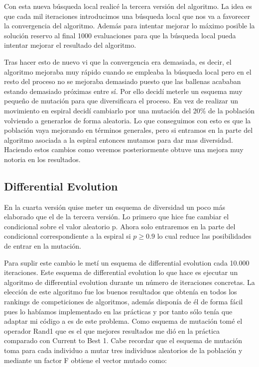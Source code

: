 \documentclass[12pt,a4paper]{article}
\begin{document}
	Con esta nueva búsqueda local realicé la tercera versión del algoritmo. La idea es que cada mil iteraciones introducimos una búsqueda local que nos va a favorecer la convergencia del algoritmo. Además para intentar mejorar lo máximo posible la solución reservo al final 1000 evaluaciones para que la búsqueda local pueda intentar mejorar el resultado del algoritmo. 
	
	Tras hacer esto de nuevo vi que la convergencia era demasiada, es decir, el algoritmo mejoraba muy rápido cuando se empleaba la búsqueda local pero en el resto del proceso no se mejoraba demasiado puesto que las ballenas acababan estando demasiado próximas entre sí. Por ello decidí meterle un esquema muy pequeño de mutación para que diversificara el proceso. En vez de realizar un movimiento en espiral decidí cambiarlo por una mutación del 20\% de la población volviendo a generarlos de forma aleatoria. Lo que conseguimos con esto es que la población vaya mejorando en términos generales, pero si entramos en la parte del algoritmo asociada a la espiral entonces mutamos para dar mas diversidad. Haciendo estos cambios como veremos posteriormente obtuve una mejora muy notoria en los resultados.
	
	\subsection{Differential Evolution}
	
    En la cuarta versión quise meter un esquema de diversidad un poco más elaborado que el de la tercera versión. Lo primero que hice fue cambiar el condicional sobre el valor aleatorio p. Ahora solo entraremos en la parte del condicional correspondiente a la espiral si $p\geq0.9$ lo cual reduce las posibilidades de entrar en la mutación.
    
    Para suplir este cambio le metí un esquema de differential evolution cada 10.000 iteraciones. Este esquema de differential evolution lo que hace es ejecutar un algoritmo de differential evolution durante un número de iteraciones concretas. La elección de este algoritmo fue los buenos resultados que obtenía en todos los rankings de competiciones de algoritmos, además disponía de él de forma fácil pues lo habíamos implementado en las prácticas y por tanto sólo tenía que adaptar mi código a es de este problema. Como esquema de mutación tomé el operador Rand1 que es el que mejores resultados me dió en la práctica comparado con Current to Best 1. Cabe recordar que el esquema de mutación toma para cada individuo a mutar tres individuos aleatorios de la población y mediante un factor F obtiene el vector mutado como:
    
\end{document}
